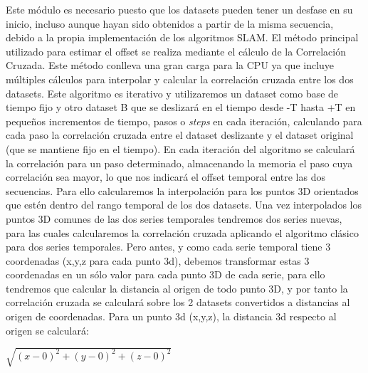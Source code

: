 Este módulo es necesario puesto que los datasets pueden tener un desfase en su inicio, incluso aunque hayan sido obtenidos a partir de la misma secuencia, debido a la propia implementación de los algoritmos SLAM. El método principal utilizado para estimar el offset se realiza mediante el cálculo de la Correlación Cruzada. 
Este método conlleva una gran carga para la CPU ya que incluye múltiples cálculos para interpolar y calcular la correlación cruzada entre los dos datasets. Este algoritmo es iterativo y utilizaremos un dataset como base de tiempo fijo y otro dataset B que se deslizará en el tiempo desde -T hasta +T en pequeños incrementos de tiempo, pasos o \textit{steps} en cada iteración, calculando para cada paso la correlación cruzada entre el dataset deslizante y el dataset original (que se mantiene fijo en el tiempo). 
En cada iteración del algoritmo se calculará la correlación para un paso determinado, almacenando la memoria el paso cuya correlación sea mayor, lo que nos indicará el offset temporal entre las dos secuencias. Para ello calcularemos la interpolación para los puntos 3D orientados que estén dentro del rango temporal de los dos datasets. Una vez interpolados los puntos 3D comunes de las dos series temporales tendremos dos series nuevas, para las cuales calcularemos la correlación cruzada aplicando el algoritmo clásico para dos series temporales. Pero antes, y como cada serie temporal tiene 3 coordenadas (x,y,z para cada punto 3d), debemos transformar estas 3 coordenadas en un sólo valor para cada punto 3D de cada serie, para ello tendremos que calcular la distancia al origen de todo punto 3D, y por tanto la correlación cruzada se calculará sobre los 2 datasets convertidos a distancias al origen de coordenadas.
Para un punto 3d (x,y,z), la distancia 3d respecto al origen se calculará:
\begin{center}
	\begin{math}
	\sqrt{(x-0)^2 +(y-0)^2+(z-0)^2}
	\end{math}
\end{center}

